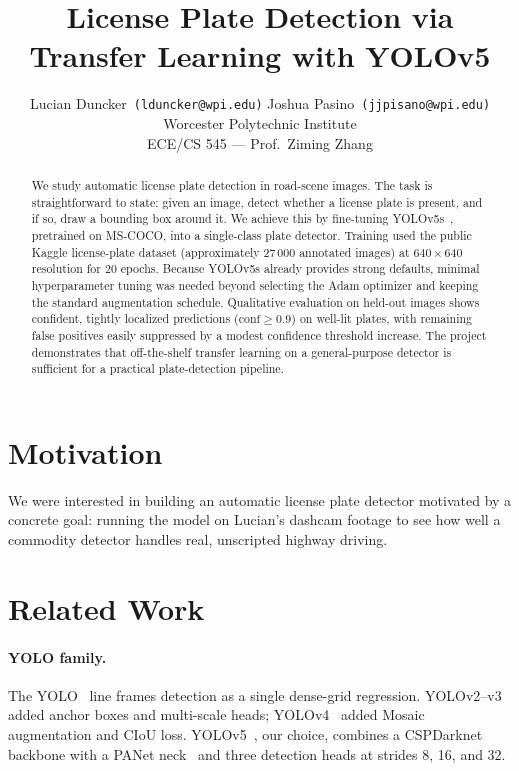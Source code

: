 \documentclass[times,10pt,twocolumn]{article}
\title{License Plate Detection via Transfer Learning with YOLOv5}
\author{
  Lucian Duncker~{\tt\small (lduncker@wpi.edu)} \quad
  Joshua Pasino~{\tt\small (jjpisano@wpi.edu)}\\[0.2em]
  Worcester Polytechnic Institute\\[0.1em]
  {\small ECE/CS 545 --- Prof.\ Ziming Zhang}
}
\begin{document}
\maketitle

\begin{abstract}
We study automatic license plate detection in road-scene images.
The task is straightforward to state: given an image, detect whether a
license plate is present, and if so, draw a bounding box around it.
We achieve this by fine-tuning YOLOv5s~\cite{jocher2020yolov5},
pretrained on MS-COCO, into a single-class plate detector.
Training used the public Kaggle license-plate dataset
(approximately 27\,000 annotated images) at $640\!\times\!640$
resolution for 20 epochs. Because YOLOv5s already provides strong
defaults, minimal hyperparameter tuning was needed beyond selecting
the Adam optimizer and keeping the standard augmentation schedule.
Qualitative evaluation on held-out images shows confident, tightly
localized predictions ($\text{conf}\!\ge\!0.9$) on well-lit plates,
with remaining false positives easily suppressed by a modest
confidence threshold increase. The project demonstrates that
off-the-shelf transfer learning on a general-purpose detector is
sufficient for a practical plate-detection pipeline.
\end{abstract}

\section{Motivation}
\label{sec:motivation}

We were interested in building an automatic license plate detector
motivated by a concrete goal: running the model on Lucian's dashcam
footage to see how well a commodity detector handles real, unscripted
highway driving.

\section{Related Work}
\label{sec:related}

\paragraph{YOLO family.}
The YOLO~\cite{redmon2016yolo} line frames detection as a single
dense-grid regression. YOLOv2--v3~\cite{redmon2017yolov2,redmon2018yolov3}
added anchor boxes and multi-scale heads; YOLOv4~\cite{bochkovskiy2020yolov4}
added Mosaic augmentation and CIoU loss. YOLOv5~\cite{jocher2020yolov5},
our choice, combines a CSPDarknet backbone with a PANet
neck~\cite{liu2018panet} and three detection heads at strides 8, 16,
and 32.
\end{document}
